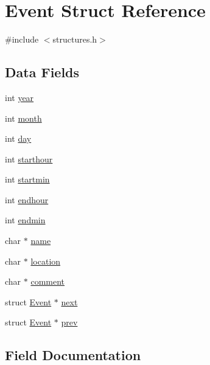 \hypertarget{struct_event}{}\section{Event Struct Reference}
\label{struct_event}


{\ttfamily \#include $<$structures.\+h$>$}

\subsection*{Data Fields}
\begin{DoxyCompactItemize}
\item 
int \hyperlink{struct_event_abeac221e38b7b9ce7df8722c842bf671}{year}
\item 
int \hyperlink{struct_event_aedb06abe5aff12fa3e7e0e71a374edfb}{month}
\item 
int \hyperlink{struct_event_a4c11afc03fc3ee49bab660def6558f2a}{day}
\item 
int \hyperlink{struct_event_ad40616cbc61c79a6caf6c8c2464bab8d}{starthour}
\item 
int \hyperlink{struct_event_a6a7bf86ae11349bf260da9abce25452a}{startmin}
\item 
int \hyperlink{struct_event_a23ec0f5427aad3f169339f21523d2041}{endhour}
\item 
int \hyperlink{struct_event_ac9b41151b48114ff949e78b68a81572b}{endmin}
\item 
char $\ast$ \hyperlink{struct_event_a5ac083a645d964373f022d03df4849c8}{name}
\item 
char $\ast$ \hyperlink{struct_event_a6a0d5603410d5eda93c0ff341966cce1}{location}
\item 
char $\ast$ \hyperlink{struct_event_a25dae25c3bf9b28d54eb4df7afb2a491}{comment}
\item 
struct \hyperlink{struct_event}{Event} $\ast$ \hyperlink{struct_event_a306f86f79bc8a24df2ff2989f10ea5b8}{next}
\item 
struct \hyperlink{struct_event}{Event} $\ast$ \hyperlink{struct_event_a587efee11d7ca5779c56b343342c65f9}{prev}
\end{DoxyCompactItemize}


\subsection{Field Documentation}
\mbox{\label{struct_event_a25dae25c3bf9b28d54eb4df7afb2a491}} 
